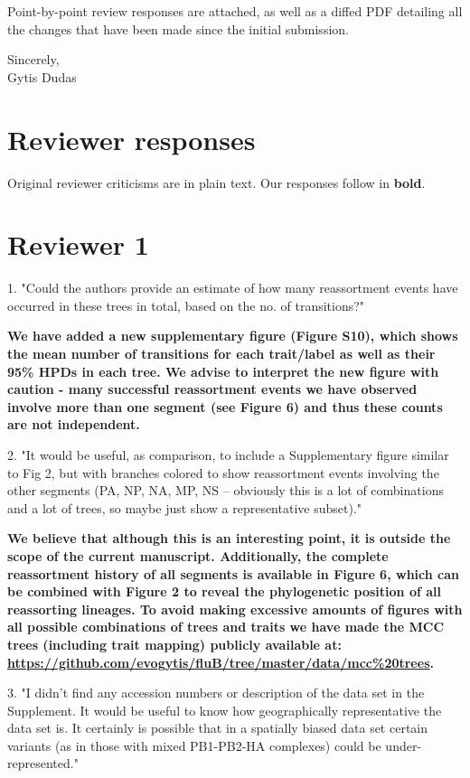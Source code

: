 \documentclass[11pt,oneside,letterpaper]{article}
\begin{document}
Point-by-point review responses are attached, as well as a diffed PDF detailing all the changes that have been made since the initial submission.

Sincerely,\\
Gytis Dudas

\restoregeometry

\newpage

\section*{Reviewer responses}

Original reviewer criticisms are in plain text.  Our responses follow in \textbf{bold}.  

\section*{Reviewer 1}
1. "Could the authors provide an estimate of how many reassortment events have occurred in these trees in total, based on the no. of transitions?"

\textbf{We have added a new supplementary figure (Figure S10), which shows the mean number of transitions for each trait/label as well as their 95\% HPDs in each tree.
We advise to interpret the new figure with caution - many successful reassortment events we have observed involve more than one segment (see Figure 6) and thus these counts are not independent.}

2. "It would be useful, as comparison, to include a Supplementary figure similar to Fig 2, but with branches colored to show reassortment events involving the other segments (PA, NP, NA, MP, NS -- obviously this is a lot of combinations and a lot of trees, so maybe just show a representative subset)."

\textbf{We believe that although this is an interesting point, it is outside the scope of the current manuscript.
Additionally, the complete reassortment history of all segments is available in Figure 6, which can be combined with Figure 2 to reveal the phylogenetic position of all reassorting lineages.
To avoid making excessive amounts of figures with all possible combinations of trees and traits we have made the MCC trees (including trait mapping) publicly available at: \url{https://github.com/evogytis/fluB/tree/master/data/mcc\%20trees}.}

3. "I didn't find any accession numbers or description of the data set in the Supplement.  
It would be useful to know how geographically representative the data set is.  
It certainly is possible that in a spatially biased data set certain variants (as in those with mixed PB1-PB2-HA complexes) could be under-represented."
\end{document}
